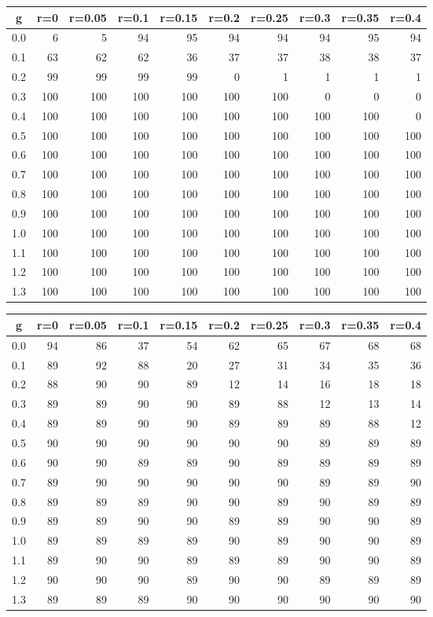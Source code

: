 %
\begin{table}[!tbp]
 \begin{center}
 \begin{tabular}{rrrrrrrrrr}\hline\hline
\multicolumn{1}{c}{g}&\multicolumn{1}{c}{r=0}&\multicolumn{1}{c}{r=0.05}&\multicolumn{1}{c}{r=0.1}&\multicolumn{1}{c}{r=0.15}&\multicolumn{1}{c}{r=0.2}&\multicolumn{1}{c}{r=0.25}&\multicolumn{1}{c}{r=0.3}&\multicolumn{1}{c}{r=0.35}&\multicolumn{1}{c}{r=0.4}\tabularnewline
\hline
0.0&  6&  5& 94& 95& 94& 94& 94& 95& 94\tabularnewline
0.1& 63& 62& 62& 36& 37& 37& 38& 38& 37\tabularnewline
0.2& 99& 99& 99& 99&  0&  1&  1&  1&  1\tabularnewline
0.3&100&100&100&100&100&100&  0&  0&  0\tabularnewline
0.4&100&100&100&100&100&100&100&100&  0\tabularnewline
0.5&100&100&100&100&100&100&100&100&100\tabularnewline
0.6&100&100&100&100&100&100&100&100&100\tabularnewline
0.7&100&100&100&100&100&100&100&100&100\tabularnewline
0.8&100&100&100&100&100&100&100&100&100\tabularnewline
0.9&100&100&100&100&100&100&100&100&100\tabularnewline
1.0&100&100&100&100&100&100&100&100&100\tabularnewline
1.1&100&100&100&100&100&100&100&100&100\tabularnewline
1.2&100&100&100&100&100&100&100&100&100\tabularnewline
1.3&100&100&100&100&100&100&100&100&100\tabularnewline
\hline
\end{tabular}

\end{center}

\end{table}

%
\begin{table}[!tbp]
 \begin{center}
 \begin{tabular}{rrrrrrrrrr}\hline\hline
\multicolumn{1}{c}{g}&\multicolumn{1}{c}{r=0}&\multicolumn{1}{c}{r=0.05}&\multicolumn{1}{c}{r=0.1}&\multicolumn{1}{c}{r=0.15}&\multicolumn{1}{c}{r=0.2}&\multicolumn{1}{c}{r=0.25}&\multicolumn{1}{c}{r=0.3}&\multicolumn{1}{c}{r=0.35}&\multicolumn{1}{c}{r=0.4}\tabularnewline
\hline
0.0&94&86&37&54&62&65&67&68&68\tabularnewline
0.1&89&92&88&20&27&31&34&35&36\tabularnewline
0.2&88&90&90&89&12&14&16&18&18\tabularnewline
0.3&89&89&90&90&89&88&12&13&14\tabularnewline
0.4&89&89&90&90&89&89&89&88&12\tabularnewline
0.5&90&90&90&90&90&90&89&89&89\tabularnewline
0.6&90&90&89&89&90&89&89&89&89\tabularnewline
0.7&89&90&90&90&90&90&89&89&90\tabularnewline
0.8&89&89&89&90&90&89&90&89&89\tabularnewline
0.9&89&89&90&90&89&89&90&90&89\tabularnewline
1.0&89&89&89&89&90&89&90&90&89\tabularnewline
1.1&89&90&90&89&89&89&90&90&89\tabularnewline
1.2&90&90&90&89&90&90&89&89&89\tabularnewline
1.3&89&89&89&90&90&90&90&90&90\tabularnewline
\hline
\end{tabular}

\end{center}

\end{table}

